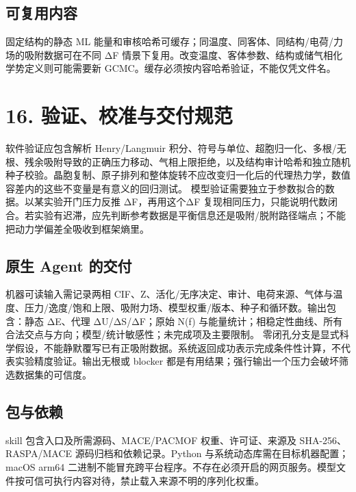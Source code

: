 \documentclass[UTF8,a4paper,11pt]{ctexart}
\begin{document}
\subsection*{可复用内容}
固定结构的静态 ML 能量和审核哈希可缓存；同温度、同客体、同结构/电荷/力场的吸附数据可在不同 ΔF 情景下复用。改变温度、客体参数、结构或储气相化学势定义则可能需要新 GCMC。缓存必须按内容哈希验证，不能仅凭文件名。
\clearpage
\section*{16. 验证、校准与交付规范}
软件验证应包含解析 Henry/Langmuir 积分、符号与单位、超胞归一化、多根/无根、残余吸附导致的正确压力移动、气相上限拒绝，以及结构审计哈希和独立随机种子校验。晶胞复制、原子排列和整体旋转不应改变归一化后的代理热力学，数值容差内的这些不变量是有意义的回归测试。
模型验证需要独立于参数拟合的数据。以某实验开门压力反推 ΔF，再用这个ΔF 复现相同压力，只能说明代数闭合。若实验有迟滞，应先判断参考数据是平衡信息还是吸附/脱附路径端点；不能把动力学偏差全吸收到框架熵里。
\subsection*{原生 Agent 的交付}
机器可读输入需记录两相 CIF、Z、活化/无序决定、审计、电荷来源、气体与温度、压力/逸度/饱和上限、吸附力场、模型权重/版本、种子和循环数。输出包含：静态 ΔE、代理 ΔU/ΔS/ΔF；原始 N(f) 与能量统计；相稳定性曲线、所有合法交点与方向；模型/统计敏感性；未完成项及主要限制。
零闭孔分支是显式科学假设，不能静默覆写已有正吸附数据。系统返回成功表示完成条件性计算，不代表实验精度验证。输出无根或 blocker 都是有用结果；强行输出一个压力会破坏筛选数据集的可信度。
\subsection*{包与依赖}
skill 包含入口及所需源码、MACE/PACMOF 权重、许可证、来源及 SHA-256、RASPA/MACE 源码归档和依赖记录。Python 与系统动态库需在目标机器配置；macOS arm64 二进制不能冒充跨平台程序。不存在必须开启的网页服务。模型文件按可信可执行内容对待，禁止载入来源不明的序列化权重。
\clearpage
\end{document}
